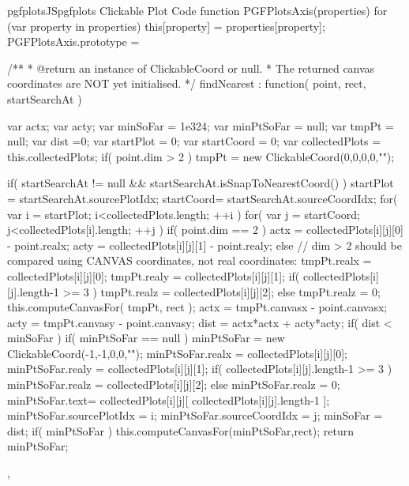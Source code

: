 {{\begin{insDLJS}[processAnnotatedPlot]{pgfplotsJS}{pgfplots Clickable Plot Code}
function PGFPlotsAxis(properties) {
	for (var property in properties)
		this[property] = properties[property];
}
PGFPlotsAxis.prototype = {
	/**
	 * @return an instance of ClickableCoord or null.
	 * The returned canvas coordinates are NOT yet initialised.
	 */
	findNearest : function( point, rect, startSearchAt )
	{
		var actx;
		var acty;
		var minSoFar = 1e324;
		var minPtSoFar = null;
		var tmpPt = null;
		var dist =0;
		var startPlot = 0;
		var startCoord = 0;
		var collectedPlots = this.collectedPlots;
		if( point.dim > 2 )
			tmpPt = new ClickableCoord(0,0,0,0,"");
			
		if( startSearchAt != null && startSearchAt.isSnapToNearestCoord() ) {
			startPlot = startSearchAt.sourcePlotIdx;
			startCoord= startSearchAt.sourceCoordIdx;
		}
		for( var i = startPlot; i<collectedPlots.length; ++i ) {
			for( var j = startCoord; j<collectedPlots[i].length; ++j ) {
				if( point.dim == 2 ) {
					actx = collectedPlots[i][j][0] - point.realx;
					acty = collectedPlots[i][j][1] - point.realy;
				} else {
					// dim > 2 should be compared using CANVAS coordinates, not real coordinates:
					tmpPt.realx = collectedPlots[i][j][0];
					tmpPt.realy = collectedPlots[i][j][1];
					if( collectedPlots[i][j].length-1 >= 3 )
						tmpPt.realz = collectedPlots[i][j][2];
					else
						tmpPt.realz = 0;
					this.computeCanvasFor( tmpPt, rect );
					actx = tmpPt.canvasx - point.canvasx;
					acty = tmpPt.canvasy - point.canvasy;
				}
				dist = actx*actx + acty*acty;
				if( dist < minSoFar ) {
					if( minPtSoFar == null )
						minPtSoFar = new ClickableCoord(-1,-1,0,0,"");
					minPtSoFar.realx = collectedPlots[i][j][0];
					minPtSoFar.realy = collectedPlots[i][j][1];
					if( collectedPlots[i][j].length-1 >= 3 )
						minPtSoFar.realz = collectedPlots[i][j][2];
					else
						minPtSoFar.realz = 0;
					minPtSoFar.text= collectedPlots[i][j][ collectedPlots[i][j].length-1 ];
					minPtSoFar.sourcePlotIdx = i;
					minPtSoFar.sourceCoordIdx = j;
					minSoFar = dist;
				}
			}
		}
		if( minPtSoFar )
			this.computeCanvasFor(minPtSoFar,rect);
		return minPtSoFar;
	},

}
\end{insDLJS}}}
